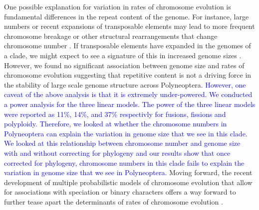 \documentclass[]{rsos}%
\begin{document}
One possible explanation for variation in rates of chromosome evolution is fundamental differences in the repeat content of the genome.
For instance, large numbers or recent expansions of transposable elements may lead to more frequent chromosome breakage or other structural rearrangements that change chromosome number \cite{carbone2014gibbon}.
If transposable elements have expanded in the genomes of a clade, we might expect to see a signature of this in increased genome sizes \cite{kidwell2002transposable}.
However, we found no significant association between genome size and rates of chromosome evolution suggesting that repetitive content is not a driving force in the stability of large scale genome structure across Polyneoptera.
\textcolor{blue}{However, one caveat of the above analysis is that it is extremely under-powered. 
We conducted a power analysis for the three linear models.
The power of the three linear models were reported as 11\%, 14\%, and 37\% respectivly for fusions, fissions and polyploidy. 
Therefore, we looked at whether the chromosome numbers in Polyneoptera can explain the variation in genome size that we see in this clade.
We looked at this relationship between chromosome number and genome size with and without correcting for phylogeny and our results show that once corrected for phylogeny, chromosome numbers in this clade fails to explain the variation in genome size that we see in Polyneoptera.}
Moving forward, the recent development of multiple probabilistic models of chromosome evolution that allow for associations with speciation or binary characters offers a way forward to further tease apart the determinants of rates of chromosome evolution \cite{freyman2018, zenil2018chromploid, blackmon2019meiotic}.


\end{document}
